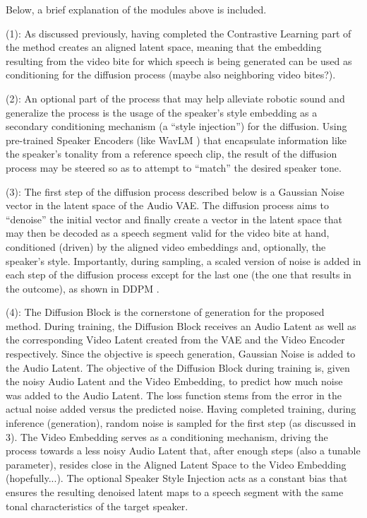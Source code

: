 \documentclass[12pt]{article}
\begin{document}
Below, a brief explanation of the modules above is included.

(1): As discussed previously, having completed the Contrastive Learning part of the method creates an aligned latent space, meaning that the embedding resulting from the video bite for which speech is being generated can be used as conditioning for the diffusion process (maybe also neighboring video bites?).

(2): An optional part of the process that may help alleviate robotic sound and generalize the process is the usage of the speaker's style embedding as a secondary conditioning mechanism (a ``style injection'') for the diffusion. Using pre-trained Speaker Encoders (like WavLM \cite{WavLM}) that encapsulate information like the speaker's tonality from a reference speech clip, the result of the diffusion process may be steered so as to attempt to ``match'' the desired speaker tone.

(3): The first step of the diffusion process described below is a Gaussian Noise vector in the latent space of the Audio VAE. The diffusion process aims to ``denoise'' the initial vector and finally create a vector in the latent space that may then be decoded as a speech segment valid for the video bite at hand, conditioned (driven) by the aligned video embeddings and, optionally, the speaker's style. Importantly, during sampling, a scaled version of noise is added in each step of the diffusion process except for the last one (the one that results in the outcome), as shown in DDPM \cite{DDPM}.

(4): The Diffusion Block is the cornerstone of generation for the proposed method. During training, the Diffusion Block receives an Audio Latent as well as the corresponding Video Latent created from the VAE and the Video Encoder respectively. Since the objective is speech generation, Gaussian Noise is added to the Audio Latent. The objective of the Diffusion Block during training is, given the noisy Audio Latent and the Video Embedding, to predict how much noise was added to the Audio Latent. The loss function stems from the error in the actual noise added versus the predicted noise. Having completed training, during inference (generation), random noise is sampled for the first step (as discussed in 3). The Video Embedding serves as a conditioning mechanism, driving the process towards a less noisy Audio Latent that, after enough steps (also a tunable parameter), resides close in the Aligned Latent Space to the Video Embedding (hopefully...). The optional Speaker Style Injection acts as a constant bias that ensures the resulting denoised latent maps to a speech segment with the same tonal characteristics of the target speaker. 
\end{document}
